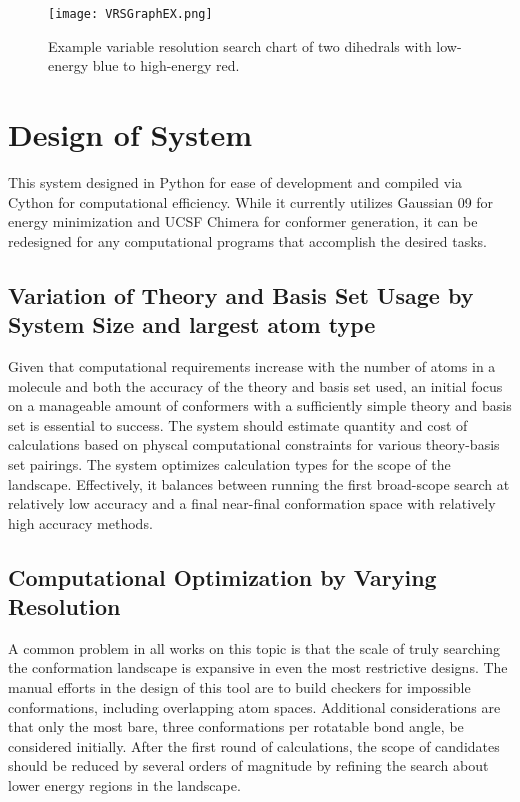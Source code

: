 \begin{figure}
	
	\centering
	
	\texttt{[image: VRSGraphEX.png]}
	
	\caption{Example variable resolution search chart of two dihedrals with low-energy blue to high-energy red. }
	
	\label{fig:variableResolutionSample}
		
\end{figure}

\section{Design of System}

This system designed in Python for ease of development and compiled via Cython for computational efficiency. 
While it currently utilizes Gaussian 09 for energy minimization and UCSF Chimera for conformer generation, it can be redesigned for any computational programs that accomplish the desired tasks.

\subsection{Variation of Theory and Basis Set Usage by System Size and largest atom type}

Given that computational requirements increase with the number of atoms in a molecule and both the accuracy of the theory and basis set used, an initial focus on a manageable amount of conformers with a sufficiently simple theory and basis set is essential to success.
The system should estimate quantity and cost of calculations based on physcal computational constraints for various theory-basis set pairings. 
The system optimizes calculation types for the scope of the landscape.
Effectively, it balances between running the first broad-scope search at relatively low accuracy and a final near-final conformation space with relatively high accuracy methods.


\subsection{Computational Optimization by Varying Resolution}

A common problem in all works on this topic is that the scale of truly searching the conformation landscape is expansive in even the most restrictive designs. 
The manual efforts in the design of this tool are to build checkers for impossible conformations, including overlapping atom spaces.
Additional considerations are that only the most bare, three conformations per rotatable bond angle, be considered initially.
After the first round of calculations, the scope of candidates should be reduced by several orders of magnitude by refining the search about lower energy regions in the landscape.


